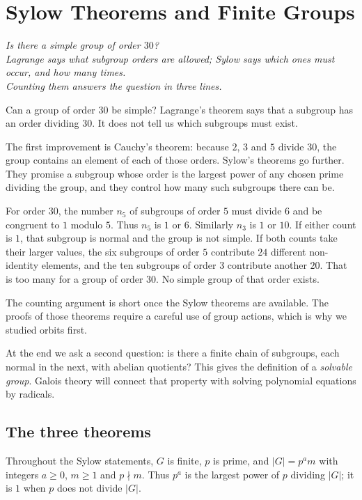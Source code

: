 \chapter{Sylow Theorems and Finite Groups}

\begin{center}\itshape
Is there a simple group of order $30$?\\
Lagrange says what subgroup orders are allowed; Sylow says which ones must occur, and how many times.\\
Counting them answers the question in three lines.
\end{center}

Can a group of order $30$ be simple? Lagrange's theorem says that a subgroup has an order dividing $30$. It does not tell us which subgroups must exist.

The first improvement is Cauchy's theorem: because $2$, $3$ and $5$ divide $30$, the group contains an element of each of those orders. Sylow's theorems go further. They promise a subgroup whose order is the largest power of any chosen prime dividing the group, and they control how many such subgroups there can be.

For order $30$, the number $n_5$ of subgroups of order $5$ must divide $6$ and be congruent to $1$ modulo $5$. Thus $n_5$ is $1$ or $6$. Similarly $n_3$ is $1$ or $10$. If either count is $1$, that subgroup is normal and the group is not simple. If both counts take their larger values, the six subgroups of order $5$ contribute $24$ different non-identity elements, and the ten subgroups of order $3$ contribute another $20$. That is too many for a group of order $30$. No simple group of that order exists.

The counting argument is short once the Sylow theorems are available. The proofs of those theorems require a careful use of group actions, which is why we studied orbits first.

At the end we ask a second question: is there a finite chain of subgroups, each normal in the next, with abelian quotients? This gives the definition of a \emph{solvable group}. Galois theory will connect that property with solving polynomial equations by radicals.

\section{The three theorems}

Throughout the Sylow statements, $G$ is finite, $p$ is prime, and
$|G|=p^a m$ with integers $a\ge0$, $m\ge1$ and $p\nmid m$.
Thus $p^a$ is the largest power of $p$ dividing $|G|$; it is $1$
when $p$ does not divide $|G|$.

